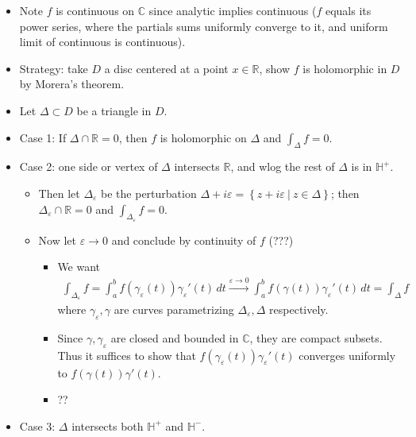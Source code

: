 \begin{solution}

\hfill

\begin{concept}

\hfill

\end{concept}

\begin{itemize}
\tightlist
\item
  Note \(f\) is continuous on \({\mathbb{C}}\) since analytic implies
  continuous (\(f\) equals its power series, where the partials sums
  uniformly converge to it, and uniform limit of continuous is
  continuous).
\item
  Strategy: take \(D\) a disc centered at a point \(x\in {\mathbb{R}}\),
  show \(f\) is holomorphic in \(D\) by Morera's theorem.
\item
  Let \(\Delta \subset D\) be a triangle in \(D\).
\item
  Case 1: If \(\Delta \cap{\mathbb{R}}= 0\), then \(f\) is holomorphic
  on \(\Delta\) and \(\int_\Delta f = 0\).
\item
  Case 2: one side or vertex of \(\Delta\) intersects \({\mathbb{R}}\),
  and wlog the rest of \(\Delta\) is in \({\mathbb{H}}^+\).

  \begin{itemize}
  \tightlist
  \item
    Then let \(\Delta_\varepsilon\) be the perturbation
    \(\Delta + i\varepsilon= \left\{{z+ i\varepsilon{~\mathrel{\Big|}~}z\in \Delta}\right\}\);
    then \(\Delta_\varepsilon\cap{\mathbb{R}}= 0\) and
    \(\int_{\Delta_\varepsilon} f = 0\).
  \item
    Now let \(\varepsilon\to 0\) and conclude by continuity of \(f\)
    (???)

    \begin{itemize}
    \tightlist
    \item
      We want
      \begin{align*}     \int_{\Delta_\varepsilon} f = \int_a^b f(\gamma_\varepsilon(t)) \gamma_\varepsilon'(t)\,dt \overset{\varepsilon\to 0}\to \int_a^b f(\gamma(t)) \gamma_\varepsilon'(t)\,dt =\int_{\Delta}  f     \end{align*}
      where \(\gamma_\varepsilon, \gamma\) are curves parametrizing
      \(\Delta_\varepsilon, \Delta\) respectively.
    \item
      Since \(\gamma, \gamma_\varepsilon\) are closed and bounded in
      \({\mathbb{C}}\), they are compact subsets. Thus it suffices to
      show that \(f(\gamma_\varepsilon(t)) \gamma_\varepsilon'(t)\)
      converges uniformly to \(f(\gamma(t))\gamma'(t)\).
    \item
      ??
    \end{itemize}
  \end{itemize}
\item
  Case 3: \(\Delta\) intersects both \({\mathbb{H}}^+\) and
  \({\mathbb{H}}^-\).


\end{itemize}
\end{solution}
